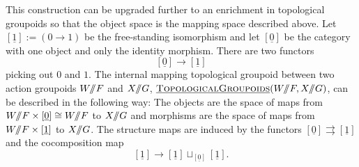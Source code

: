 This construction can be upgraded further to an enrichment in topological groupoids so that the object space is the mapping space described above. Let $[\underline{1}] := (0 \rightarrow 1)$ be the free-standing isomorphism and let $[\underline{0}]$ be the category with one object and only the identity morphism. There are two functors 
\[
[\underline{0}] \rightarrow [\underline{1}]
\]
picking out $0$ and $1$. The internal mapping topological groupoid between two action groupoids $W /\!\!/ F$ and $X/\!\!/ G$, $\operatorname{\underline{\smash{\normalfont\textsc{TopologicalGroupoids}}}}(W /\!\!/ F, X /\!\!/ G)$, can be described in the following way: The objects are the space of maps from $W /\!\!/ F \times [\underline{0}] \cong W /\!\!/ F$ to $X /\!\!/ G$ and morphisms are the space of maps from $W /\!\!/ F \times [\underline{1}]$ to $X /\!\!/ G$. The structure maps are induced by the functors $[\underline{0}] \rightrightarrows [\underline{1}]$ and the cocomposition map
\[
[\underline{1}] \rightarrow [\underline{1}] \sqcup_{[\underline{0}]} [\underline{1}].
\]
%


